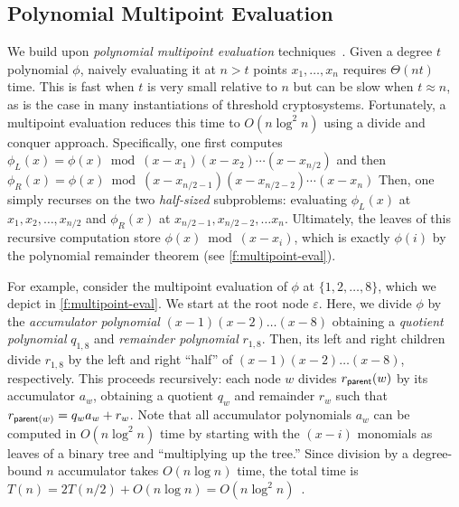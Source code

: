 \subsection{Polynomial Multipoint Evaluation}
\label{s:prelim:multipoint-eval}

We build upon \textit{polynomial multipoint evaluation} techniques~\cite{moderncomputeralgebra-ch10}.
Given a degree $t$ polynomial $\phi$, naively evaluating it at $n > t$ points $x_1, \dots, x_n$ requires $\Theta(nt)$ time.
This is fast when $t$ is very small relative to $n$ but can be slow when $t \approx n$, as is the case in many instantiations of threshold cryptosystems.
Fortunately, a multipoint evaluation reduces this time to $O(n\log^2{n})$ using a divide and conquer approach.
Specifically, one first computes $\phi_L(x)=\phi(x) \bmod (x-x_1)(x-x_2)\cdots(x-x_{n/2})$ and then $\phi_R(x)=\phi(x) \bmod (x-x_{n/2-1})(x-x_{n/2-2})\cdots(x-x_n)$
Then, one simply recurses on the two \textit{half-sized} subproblems: evaluating $\phi_L(x)$ at $x_1, x_2, \dots, x_{n/2}$ and $\phi_R(x)$ at $x_{n/2-1}, x_{n/2-2},\dots x_n$.
Ultimately, the leaves of this recursive computation store $\phi(x) \bmod (x-x_i)$, which is exactly $\phi(i)$ by the polynomial remainder theorem (see \cref{f:multipoint-eval}).

For example, consider the multipoint evaluation of $\phi$ at $\{1,2,\dots,8\}$, which we depict in \cref{f:multipoint-eval}.
We start at the root node $\varepsilon$.
Here, we divide $\phi$ by the \textit{accumulator polynomial} $(x-1)(x-2)\dots(x-8)$ obtaining a \textit{quotient polynomial} $q_{1,8}$ and \textit{remainder polynomial} $r_{1,8}$.
Then, its left and right children divide $r_{1,8}$ by the left and right ``half'' of $(x-1)(x-2)\dots(x-8)$, respectively.
This proceeds recursively: each node $w$ divides $r_{\mathsf{parent}}(w)$ by its accumulator $a_w$, obtaining a quotient $q_w$ and remainder $r_w$ such that $r_{\mathsf{parent}(w)} = q_w a_w + r_w$.
Note that all accumulator polynomials $a_w$ can be computed in $O(n\log^2{n})$ time by starting with the $(x-i)$ monomials as leaves of a binary tree and ``multiplying up the tree.''
Since division by a degree-bound $n$ accumulator takes $O(n\log{n})$ time, the total time is $T(n)=2T(n/2)+O(n\log{n}) = O(n\log^2{n})$~\cite{moderncomputeralgebra-ch10}.
